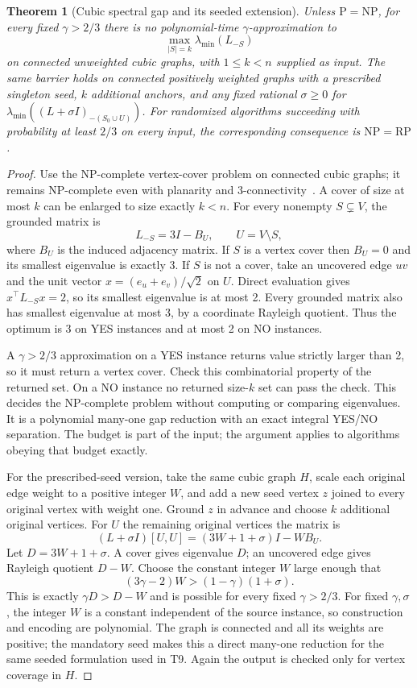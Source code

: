 \documentclass[11pt]{article}
\newtheorem{theorem}{Theorem}
\begin{document}
\begin{theorem}[Cubic spectral gap and its seeded extension]
\label{thm:spectralhardness}
Unless $\mathrm P=\mathrm{NP}$, for every fixed $\gamma>2/3$
there is no polynomial-time $\gamma$-approximation to
\[
 \max_{|S|=k}\lambda_{\min}(L_{-S})
\]
on connected unweighted cubic graphs, with $1\leq k<n$ supplied
as input. The same barrier holds on connected positively weighted
graphs with a prescribed singleton seed, $k$ additional anchors,
and any fixed rational $\sigma\geq0$ for
$\lambda_{\min}((L+\sigma I)_{-(S_0\cup U)})$.
For randomized algorithms succeeding with probability at least
$2/3$ on every input, the corresponding consequence is
$\mathrm{NP}=\mathrm{RP}$.
\end{theorem}
\begin{proof}
Use the NP-complete vertex-cover problem on connected cubic
graphs; it remains NP-complete even with planarity and
3-connectivity~\cite{uehara1996}. A cover of size at most $k$ can
be enlarged to size exactly $k<n$.
For every nonempty $S\subsetneq V$, the grounded matrix is
\[
 L_{-S}=3I-B_U,\qquad U=V\setminus S,
\]
where $B_U$ is the induced adjacency matrix. If $S$ is a vertex
cover then $B_U=0$ and its smallest eigenvalue is exactly 3.
If $S$ is not a cover, take an uncovered edge $uv$ and the unit
vector $x=(e_u+e_v)/\sqrt2$ on $U$. Direct evaluation gives
$x^\top L_{-S}x=2$, so its smallest eigenvalue is at most 2.
Every grounded matrix also has smallest eigenvalue at most 3,
by a coordinate Rayleigh quotient. Thus the optimum is 3 on
YES instances and at most 2 on NO instances.

A $\gamma>2/3$ approximation on a YES instance returns value
strictly larger than 2, so it must return a vertex cover. Check
this combinatorial property of the returned set. On a NO instance
no returned size-$k$ set can pass the check. This decides the
NP-complete problem without computing or comparing eigenvalues.
It is a polynomial many-one gap reduction with an exact integral
YES/NO separation. The budget is part of the input; the argument
applies to algorithms obeying that budget exactly.

For the prescribed-seed version, take the same cubic graph $H$,
scale each original edge weight to a positive integer $W$, and add
a new seed vertex $z$ joined to every original vertex with weight
one. Ground $z$ in advance and choose $k$ additional original
vertices. For $U$ the remaining original vertices the matrix is
\begin{equation}\label{eq:seedhardgap}
 (L+\sigma I)[U,U]=(3W+1+\sigma)I-W B_U.
\end{equation}
Let $D=3W+1+\sigma$. A cover gives eigenvalue $D$; an uncovered
edge gives Rayleigh quotient $D-W$. Choose the constant integer
$W$ large enough that
\[
 (3\gamma-2)W>(1-\gamma)(1+\sigma).
\]
This is exactly $\gamma D>D-W$ and is possible for every fixed
$\gamma>2/3$. For fixed $\gamma,\sigma$, the integer $W$ is a
constant independent of the source instance, so construction and
encoding are polynomial. The graph is connected and all its
weights are positive; the mandatory seed makes this a direct
many-one reduction for the same seeded formulation used in T9.
Again the output is checked only for vertex coverage in $H$.


\end{proof}
\end{document}
